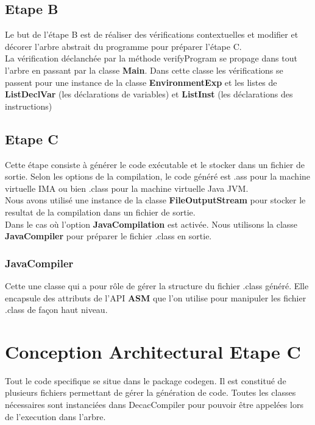 \documentclass[12pt, a4paper, one side]{article}
\begin{document}
    \subsection{Etape B}
    Le but de l'étape B est de réaliser des vérifications contextuelles et modifier et décorer l'arbre abstrait du programme pour préparer l'étape C.
    \\
    La vérification déclanchée par la méthode verifyProgram se propage dans tout l'arbre en passant par la classe \textbf{Main}. Dans cette classe les vérifications se passent pour une instance de la classe \textbf{EnvironmentExp} et les listes de \textbf{ListDeclVar} (les déclarations de variables) et \textbf{ListInst} (les déclarations des instructions)

    \subsection{Etape C}
    Cette étape consiste à générer le code exécutable et le stocker dans un fichier de sortie. Selon les options de la compilation, le code généré est .ass pour la machine virtuelle IMA ou bien .class pour la machine virtuelle Java JVM.
    \\
    Nous avons utilisé une instance de la classe \textbf{FileOutputStream} pour stocker le resultat de la compilation dans un fichier de sortie.\\
    Dans le cas où l'option \textbf{JavaCompilation} est activée. Nous utilisons la classe \textbf{JavaCompiler} pour préparer le fichier .class en sortie.

    \subsubsection{JavaCompiler}
    Cette une classe qui a pour rôle de gérer la structure du fichier .class généré. Elle encapsule des attributs de l'API \textbf{ASM} que l'on utilise pour manipuler les fichier .class de façon haut niveau.

    \section{Conception Architectural Etape C}

    Tout le code specifique se situe dans le package codegen. Il est constitué de plusieurs fichiers
    permettant de gérer la génération de code. Toutes les classes nécessaires sont instanciées dans DecacCompiler
    pour pouvoir être appelées lors de l'execution dans l'arbre.
\end{document}
